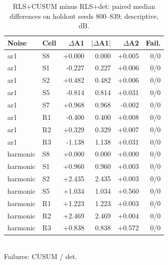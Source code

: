 \begin{table}[t]\centering\caption{RLS+CUSUM minus RLS+det: paired median differences on holdout seeds 800--839; descriptive, dB.}\label{tab:cusum}
\scriptsize\begin{tabular}{llrrrr}\toprule
Noise & Cell & $\Delta$A1 & $|\Delta$A1$|$ & $\Delta$A2 & Fail. \\ \midrule
ar1 & S8 & +0.000 & 0.000 & +0.005 & 0/0 \\
ar1 & S1 & -0.227 & 0.227 & +0.006 & 0/0 \\
ar1 & S2 & +0.482 & 0.482 & +0.006 & 0/0 \\
ar1 & S5 & -0.814 & 0.814 & +0.031 & 0/0 \\
ar1 & S7 & +0.968 & 0.968 & -0.002 & 0/0 \\
ar1 & R1 & -0.400 & 0.400 & +0.008 & 0/0 \\
ar1 & R2 & +0.329 & 0.329 & +0.007 & 0/0 \\
ar1 & R3 & -1.138 & 1.138 & +0.031 & 0/0 \\
harmonic & S8 & +0.000 & 0.000 & +0.000 & 0/0 \\
harmonic & S1 & +0.960 & 0.960 & +0.003 & 0/0 \\
harmonic & S2 & +2.435 & 2.435 & +0.003 & 0/0 \\
harmonic & S5 & +1.034 & 1.034 & +0.560 & 0/0 \\
harmonic & R1 & +1.223 & 1.223 & +0.003 & 0/0 \\
harmonic & R2 & +2.469 & 2.469 & +0.004 & 0/0 \\
harmonic & R3 & +0.838 & 0.838 & +0.572 & 0/0 \\
\bottomrule\end{tabular}\\{\scriptsize Failures: CUSUM / det.}
\end{table}
